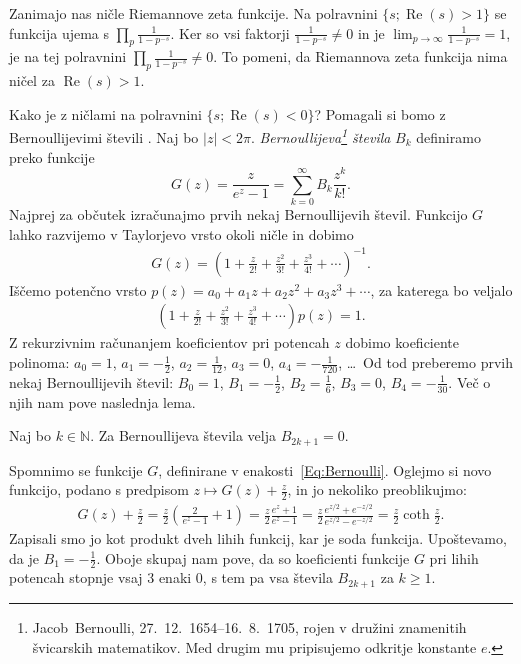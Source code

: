 \documentclass[mat1]{fmfdelo}
\DeclareMathOperator{\re}{Re}
\begin{document}
Zanimajo nas ničle Riemannove zeta funkcije. Na polravnini $\{s; \re(s)>1\}$ se funkcija ujema s $\prod_{p}\frac{1}{1-p^{-s}}$. Ker so vsi faktorji $\frac{1}{1-p^{-s}} \neq 0$ in je $\lim_{p\to\infty} \frac{1}{1-p^{-s}} = 1$, je na tej polravnini $\prod_{p}\frac{1}{1-p^{-s}} \neq 0$. To pomeni, da Riemannova zeta funkcija nima ničel za $\re(s)>1$.

Kako je z ničlami na polravnini $\{s; \re(s)<0\}$?
Pomagali si bomo z Bernoullijevimi števili \cite[poglavje 3]{bernoulli}. Naj bo $|z|<2\pi$. \emph{Bernoullijeva\footnote{Jacob~Bernoulli, 27.\ 12.\ 1654--16.\ 8.\ 1705, rojen v družini znamenitih švicarskih matematikov. Med drugim mu pripisujemo odkritje konstante $e$.} števila} $B_{k}$ definiramo preko funkcije
\begin{equation}
\label{Eq:Bernoulli}
G(z) = \frac{z}{e^z-1} = \sum_{k=0}^{\infty} B_{k} \frac{z^k}{k!}.
\end{equation}
%
Najprej za občutek izračunajmo prvih nekaj Bernoullijevih števil. Funkcijo $G$ lahko razvijemo v Taylorjevo vrsto okoli ničle in dobimo
\begin{align*}
G(z) = \left(1 + \frac{z}{2!} + \frac{z^2}{3!} + \frac{z^3}{4!} + \cdots \right)^{-1}.
\end{align*}
%
Iščemo potenčno vrsto $p(z) = a_{0}+a_{1}z+a_{2}z^2+a_{3}z^3+\cdots$, za katerega bo veljalo
\begin{align*}
\left(1 + \frac{z}{2!} + \frac{z^2}{3!} + \frac{z^3}{4!} + \cdots \right) p(z) = 1.
\end{align*}
%
Z rekurzivnim računanjem koeficientov pri potencah $z$ dobimo koeficiente polinoma: $a_{0}=1$, $a_{1}=-\frac{1}{2}$, $a_{2}=\frac{1}{12}$, $a_{3}=0$, $a_{4}=-\frac{1}{720}$, \ldots\ Od tod preberemo prvih nekaj Bernoullijevih števil: $B_{0} = 1$, $B_{1} = -\frac{1}{2}$,  $B_{2} = \frac{1}{6}$,  $B_{3} = 0$, $B_{4} = -\frac{1}{30}$.
Več o njih nam pove naslednja lema.

\begin{lema}
Naj bo $k \in \mathbb{N}$. Za Bernoullijeva števila velja $B_{2k+1}=0$.
\end{lema}

\begin{dokaz}
Spomnimo se funkcije $G$, definirane v enakosti~\eqref{Eq:Bernoulli}. Oglejmo si novo funkcijo, podano s predpisom $z \mapsto G(z)+\frac{z}{2}$, in jo nekoliko preoblikujmo:
\begin{align}
G(z) + \frac{z}{2} = \frac{z}{2} \left( \frac{2}{e^{z}-1}+1 \right) = \frac{z}{2} \frac{e^{z}+1}{e^{z}-1} 
	= \frac{z}{2} \frac{e^{z/2}+e^{-z/2}}{e^{z/2}-e^{-z/2}} = \frac{z}{2} \coth{\frac{z}{2}}.
\end{align}
%
Zapisali smo jo kot produkt dveh lihih funkcij, kar je soda funkcija. Upoštevamo, da je $B_{1}=-\frac{1}{2}$. Oboje skupaj nam pove, da so koeficienti funkcije $G$ pri lihih potencah stopnje vsaj $3$ enaki $0$, s tem pa vsa števila $B_{2k+1}$ za $k \geq 1$.
\end{dokaz}
\end{document}
